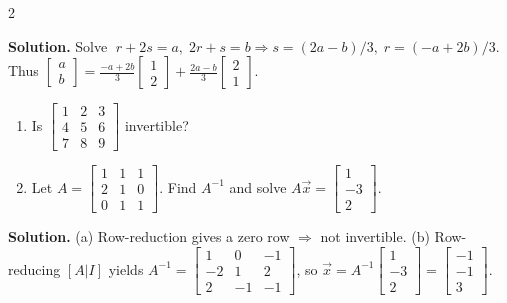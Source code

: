 \documentclass[8pt]{extarticle}
\begin{document}
\begin{multicols}{2}
\begin{tcolorbox}[title=]
\textbf{Solution.}
Solve
\(\;r+2s=a,\;2r+s=b\Rightarrow
s=(2a-b)/3,\; r=(-a+2b)/3\).
Thus
\(
\begin{bmatrix}a\\b\end{bmatrix}
=\frac{-a+2b}{3}\begin{bmatrix}1\\2\end{bmatrix}
+\frac{2a-b}{3}\begin{bmatrix}2\\1\end{bmatrix}.
\)
\end{tcolorbox}

\begin{tcolorbox}[title=]
\noindent
\begin{enumerate}
\item[(a)] Is
\(
\begin{bmatrix}
1&2&3\\
4&5&6\\
7&8&9
\end{bmatrix}
\)
invertible?
\item[(b)] Let
\(A=\begin{bmatrix}1&1&1\\2&1&0\\0&1&1\end{bmatrix}\).
Find \(A^{-1}\) and solve
\(A\vec{x}=\begin{bmatrix}1\\-3\\2\end{bmatrix}\).
\end{enumerate}

\textbf{Solution.}
(a) Row-reduction gives a zero row \(\Rightarrow\) not invertible.  
(b) Row-reducing \([A|I]\) yields
\(A^{-1}=\begin{bmatrix}1&0&-1\\-2&1&2\\2&-1&-1\end{bmatrix}\),
so
\(\vec x=A^{-1}\begin{bmatrix}1\\-3\\2\end{bmatrix}=\begin{bmatrix}-1\\-1\\3\end{bmatrix}\).
\end{tcolorbox}


\end{multicols}
\end{document}
